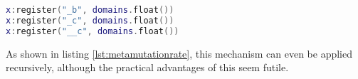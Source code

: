 \begin{lstlisting}[language=lua, caption={Letting the genetic algorithm adapt the mutation rate \emph{per trait}.}, label=lst:metamutationrate, name=lst:metamutationrate]
x:register("_b", domains.float())
x:register("_c", domains.float())
x:register("__c", domains.float())
\end{lstlisting}

As shown in listing \ref{lst:metamutationrate}, this mechanism can even be applied recursively, although the practical advantages of this seem futile.





